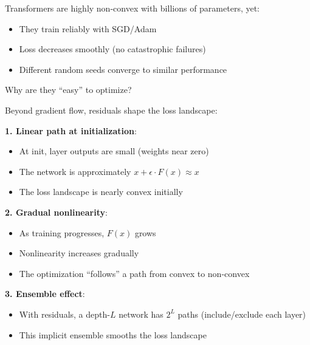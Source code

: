 \begin{remark}
    Transformers are highly non-convex with billions of parameters, yet:
    \begin{itemize}
        \item They train reliably with SGD/Adam
        \item Loss decreases smoothly (no catastrophic failures)
        \item Different random seeds converge to similar performance
    \end{itemize}

    Why are they ``easy'' to optimize?
\end{remark}

\begin{remark}
    Beyond gradient flow, residuals shape the loss landscape:

    \textbf{1. Linear path at initialization}:
    \begin{itemize}
        \item At init, layer outputs are small (weights near zero)
        \item The network is approximately $x + \epsilon \cdot F(x) \approx x$
        \item The loss landscape is nearly convex initially
    \end{itemize}

    \textbf{2. Gradual nonlinearity}:
    \begin{itemize}
        \item As training progresses, $F(x)$ grows
        \item Nonlinearity increases gradually
        \item The optimization ``follows'' a path from convex to non-convex
    \end{itemize}

    \textbf{3. Ensemble effect}:
    \begin{itemize}
        \item With residuals, a depth-$L$ network has $2^L$ paths (include/exclude each layer)
        \item This implicit ensemble smooths the loss landscape
    \end{itemize}
\end{remark}

